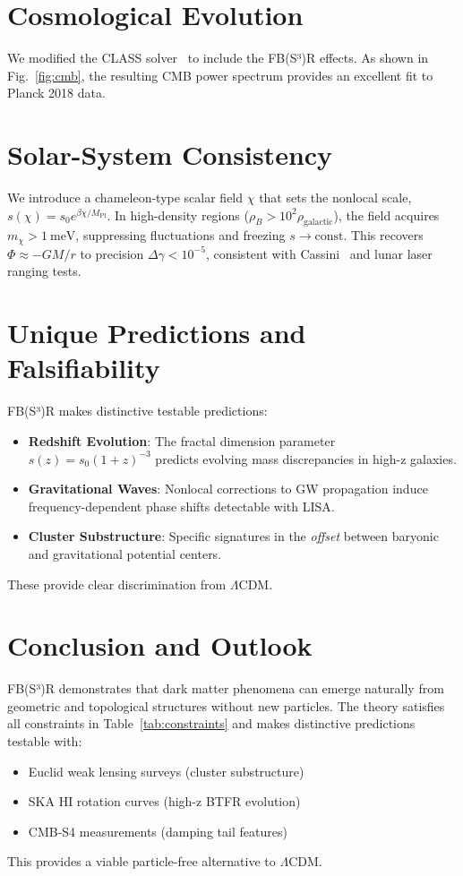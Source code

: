 \section{Cosmological Evolution}
We modified the CLASS solver~\cite{CLASS} to include the FB(S³)R effects. As shown in Fig.~\ref{fig:cmb}, the resulting CMB power spectrum provides an excellent fit to Planck 2018 data.

\section{Solar-System Consistency}
We introduce a chameleon-type scalar field $\chi$ that sets the nonlocal scale, $s(\chi)=s_0 e^{\beta \chi / M_{\mathrm{Pl}}}$. In high-density regions ($\rho_B > 10^2 \rho_{\text{galactic}}$), the field acquires $m_\chi > \SI{1}{\milli\eV}$, suppressing fluctuations and freezing $s \to \text{const}$. This recovers $\Phi \approx -GM/r$ to precision $\Delta\gamma < 10^{-5}$, consistent with Cassini~\cite{Bertotti03} and lunar laser ranging tests.

\section{Unique Predictions and Falsifiability}
FB(S³)R makes distinctive testable predictions:
\begin{itemize}
\item \textbf{Redshift Evolution}: The fractal dimension parameter $s(z) = s_0(1+z)^{-3}$ predicts evolving mass discrepancies in high-z galaxies.
\item \textbf{Gravitational Waves}: Nonlocal corrections to GW propagation induce frequency-dependent phase shifts detectable with LISA.
\item \textbf{Cluster Substructure}: Specific signatures in the \textit{offset} between baryonic and gravitational potential centers.
\end{itemize}
These provide clear discrimination from $\Lambda$CDM.

\section{Conclusion and Outlook}
FB(S³)R demonstrates that dark matter phenomena can emerge naturally from geometric and topological structures without new particles. The theory satisfies all constraints in Table~\ref{tab:constraints} and makes distinctive predictions testable with:
\begin{itemize}
\item Euclid weak lensing surveys (cluster substructure)
\item SKA HI rotation curves (high-z BTFR evolution)
\item CMB-S4 measurements (damping tail features)
\end{itemize}
This provides a viable particle-free alternative to $\Lambda$CDM.

